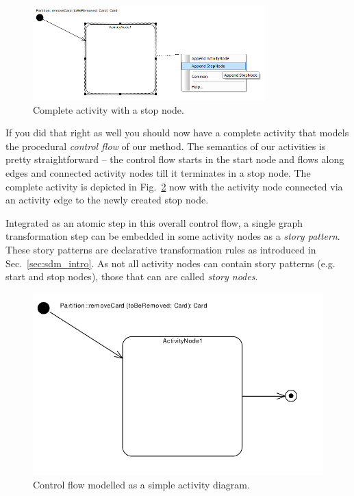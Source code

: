 \begin{figure}[htp]
\begin{center}
  \includegraphics[width=0.8\textwidth]{pics/sdmBilder/removeCard/sdm05RAW}
  \caption{Complete activity with a stop node.}  
  \label{fig:sdm_stop_node}
\end{center}
\end{figure}

If you did that right as well you should now have a complete activity that
models the procedural \emph{control flow} of our method.  The semantics of our
activities is pretty straightforward -- the control flow starts in the start
node and flows along edges and connected activity nodes till it terminates in a
stop node.  The complete activity is depicted in
Fig.~\ref{fig:sdm_complete_control_flow_simple} now with the activity node
connected via an activity edge to the newly created stop node.

\label{story-pattern}

Integrated as an atomic step in this overall control flow, a single graph
transformation step can be embedded in some activity nodes as a \emph{story
pattern}.  These story patterns are declarative transformation rules as introduced in
Sec.~\ref{sec:sdm_intro}.  As not all activity nodes can contain story
patterns (e.g. start and stop nodes), those that can are called \emph{story
nodes}. 


\begin{figure}[htp]
\begin{center}
  \includegraphics[width=\textwidth]{pics/sdmBilder/removeCard/sdm06RAW.pdf}
  \caption{Control flow modelled as a simple activity diagram.}  
  \label{fig:sdm_complete_control_flow_simple}
\end{center}
\end{figure}

